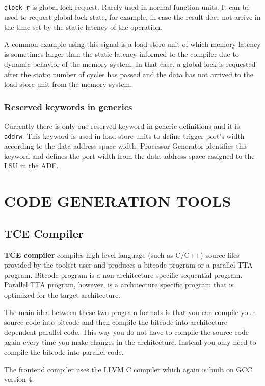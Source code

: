 \documentclass[twoside]{tceusermanual}
\begin{document}
\verb|glock_r| is global lock request. Rarely used in normal function units.
It can be used to request global lock state, for example, in case the
result does not arrive in the time set by the static latency of the
operation. 

A common example using this signal is a load-store unit of which
memory latency is sometimes larger than the static latency informed to the
compiler due to dynamic behavior of the memory system. In that case, a
global lock is requested after the static number of cycles has passed and
the data has not arrived to the load-store-unit from the memory system.

\subsection{Reserved keywords in generics}

Currently there is only one reserved keyword in generic definitions and it is
\verb|addrw|. This keyword is used in load-store units to define trigger
port's width according to the data address space width. Processor Generator
identifies this keyword and defines the port width from the data address space
assigned to the LSU in the ADF.


\chapter{CODE GENERATION TOOLS}

\section{TCE Compiler}
\label{sec:frontend}

\textbf{TCE compiler} compiles high level language (such as 
C/C++) source files provided by the toolset user and produces a bitcode
program or a parallel TTA program. Bitcode program is a non-architecture
specific sequential program. Parallel TTA program, however, is 
a architecture specific program that is optimized for the target architecture.

The main idea between these two program formats is that you can compile your
source code into bitcode and then compile the bitcode into architecture
dependent parallel code. This way you do not have to compile the source code
again every time you make changes in the architecture. Instead you only need
to compile the bitcode into parallel code.

The frontend compiler uses the LLVM C compiler which again is built on GCC
version 4.
\end{document}
